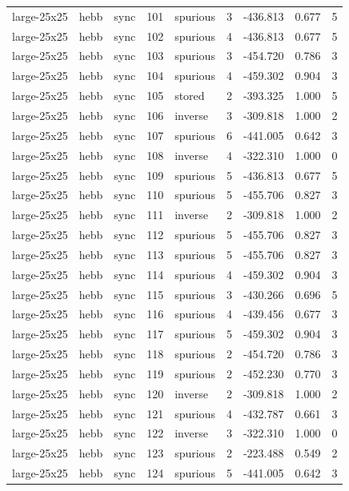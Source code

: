 \begin{tabular}{lllrlrrrr}
large-25x25 & hebb & sync & 101 & spurious & 3 & -436.813 & 0.677 & 5 \\
large-25x25 & hebb & sync & 102 & spurious & 4 & -436.813 & 0.677 & 5 \\
large-25x25 & hebb & sync & 103 & spurious & 3 & -454.720 & 0.786 & 3 \\
large-25x25 & hebb & sync & 104 & spurious & 4 & -459.302 & 0.904 & 3 \\
large-25x25 & hebb & sync & 105 & stored & 2 & -393.325 & 1.000 & 5 \\
large-25x25 & hebb & sync & 106 & inverse & 3 & -309.818 & 1.000 & 2 \\
large-25x25 & hebb & sync & 107 & spurious & 6 & -441.005 & 0.642 & 3 \\
large-25x25 & hebb & sync & 108 & inverse & 4 & -322.310 & 1.000 & 0 \\
large-25x25 & hebb & sync & 109 & spurious & 5 & -436.813 & 0.677 & 5 \\
large-25x25 & hebb & sync & 110 & spurious & 5 & -455.706 & 0.827 & 3 \\
large-25x25 & hebb & sync & 111 & inverse & 2 & -309.818 & 1.000 & 2 \\
large-25x25 & hebb & sync & 112 & spurious & 5 & -455.706 & 0.827 & 3 \\
large-25x25 & hebb & sync & 113 & spurious & 5 & -455.706 & 0.827 & 3 \\
large-25x25 & hebb & sync & 114 & spurious & 4 & -459.302 & 0.904 & 3 \\
large-25x25 & hebb & sync & 115 & spurious & 3 & -430.266 & 0.696 & 5 \\
large-25x25 & hebb & sync & 116 & spurious & 4 & -439.456 & 0.677 & 3 \\
large-25x25 & hebb & sync & 117 & spurious & 5 & -459.302 & 0.904 & 3 \\
large-25x25 & hebb & sync & 118 & spurious & 2 & -454.720 & 0.786 & 3 \\
large-25x25 & hebb & sync & 119 & spurious & 2 & -452.230 & 0.770 & 3 \\
large-25x25 & hebb & sync & 120 & inverse & 2 & -309.818 & 1.000 & 2 \\
large-25x25 & hebb & sync & 121 & spurious & 4 & -432.787 & 0.661 & 3 \\
large-25x25 & hebb & sync & 122 & inverse & 3 & -322.310 & 1.000 & 0 \\
large-25x25 & hebb & sync & 123 & spurious & 2 & -223.488 & 0.549 & 2 \\
large-25x25 & hebb & sync & 124 & spurious & 5 & -441.005 & 0.642 & 3 \\

\end{tabular}
